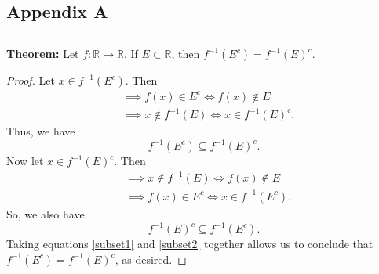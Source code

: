 \documentclass{article}
\begin{document}
\begin{appendices}
	
\section{Appendix A}
\subsection{}
\label{appendix:A.1}
\textbf{Theorem:} Let $f:\mathbb{R}\rightarrow\mathbb{R}$. If $E \subset \mathbb{R}$, then $f^{-1}(E^c) = f^{-1}(E)^c$.
\begin{proof}
	Let $x \in f^{-1}(E^c)$. Then
	\begin{align}
		&\implies f(x) \in E^c \iff f(x) \notin E \\
		&\implies x \notin f^{-1}(E) \iff x \in f^{-1}(E)^c.
	\end{align}
	Thus, we have
	\begin{equation}\label{subset1}
		f^{-1}(E^c) \subseteq f^{-1}(E)^c.
	\end{equation}
	Now let $x\in f^{-1}(E)^c$. Then
	\begin{align}
		&\implies x \notin f^{-1}(E) \iff f(x) \notin E \\
		&\implies f(x) \in E^c \iff x \in f^{-1}(E^c).
	\end{align}
	So, we also have
	\begin{equation}\label{subset2}
		f^{-1}(E)^c \subseteq f^{-1}(E^c).
	\end{equation}
	Taking equations \eqref{subset1} and \eqref{subset2} together allows us to conclude that \\$f^{-1}(E^c) = f^{-1}(E)^c$, as desired.
\end{proof}

\subsection{}
\label{appendix:A.2}


\end{appendices}
\end{document}
